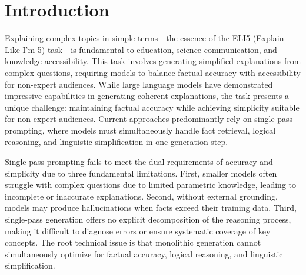 \section{Introduction}

Explaining complex topics in simple terms---the essence of the ELI5 (Explain Like I'm 5) task---is fundamental to education, science communication, and knowledge accessibility. This task involves generating simplified explanations from complex questions, requiring models to balance factual accuracy with accessibility for non-expert audiences. While large language models have demonstrated impressive capabilities in generating coherent explanations, the task presents a unique challenge: maintaining factual accuracy while achieving simplicity suitable for non-expert audiences. Current approaches predominantly rely on single-pass prompting, where models must simultaneously handle fact retrieval, logical reasoning, and linguistic simplification in one generation step.

Single-pass prompting fails to meet the dual requirements of accuracy and simplicity due to three fundamental limitations. First, smaller models often struggle with complex questions due to limited parametric knowledge, leading to incomplete or inaccurate explanations. Second, without external grounding, models may produce hallucinations when facts exceed their training data. Third, single-pass generation offers no explicit decomposition of the reasoning process, making it difficult to diagnose errors or ensure systematic coverage of key concepts. The root technical issue is that monolithic generation cannot simultaneously optimize for factual accuracy, logical reasoning, and linguistic simplification.

